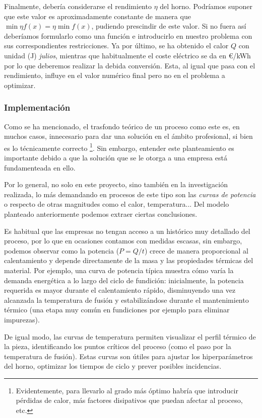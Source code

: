 Finalmente, debería considerarse el rendimiento $\eta$ del horno. Podríamos suponer que este valor es aproximadamente constante de manera que $\min{\eta f(x)} = \eta \min{f(x)}$, pudiendo prescindir de este valor. Si no fuera así deberíamos formularlo como una función e introducirlo en nuestro problema con sus correspondientes restricciones. Ya por último, se ha obtenido el calor $Q$ con unidad (J) \textit{julios}, mientras que habitualmente el coste eléctrico se da en \euro/kWh por lo que deberemos realizar la debida conversión. Esta, al igual que pasa con el rendimiento, influye en el valor numérico final pero no en el problema a optimizar.
%
%
\subsubsection{Implementación}
%
%
Como se ha mencionado, el trasfondo teórico de un proceso como este es, en muchos casos, innecesario para dar una solución en el ámbito profesional, si bien es lo técnicamente correcto \footnote{Evidentemente, para llevarlo al grado más óptimo habría que introducir pérdidas de calor, más factores disipativos que puedan afectar al proceso, etc.}. Sin embargo, entender este planteamiento es importante debido a que la solución que se le otorga a una empresa está fundamenteada en ello.

Por lo general, no solo en este proyecto, sino también en la investigación realizada, lo más demandando en procesos de este tipo son las \textit{curvas de potencia} o respecto de otras magnitudes como el calor, temperatura... Del modelo planteado anteriormente podemos extraer ciertas conclusiones.

Es habitual que las empresas no tengan acceso a un histórico muy detallado del proceso, por lo que en ocasiones contamos con medidas escasas, sin embargo, podemos observar como la potencia ($P = Q/t$) crece de manera proporcional al calentamiento y depende directamente de la masa y las propiedades térmicas del material. Por ejemplo, una curva de potencia típica muestra cómo varía la demanda energética a lo largo del ciclo de fundición: inicialmente, la potencia requerida es mayor durante el calentamiento rápido, disminuyendo una vez alcanzada la temperatura de fusión y estabilizándose durante el mantenimiento térmico (una etapa muy común en fundiciones por ejemplo para eliminar impurezas).

De igual modo, las curvas de temperatura permiten visualizar el perfil térmico de la pieza, identificando los puntos críticos del proceso (como el paso por la temperatura de fusión). Estas curvas son útiles para ajustar los hiperparámetros del horno, optimizar los tiempos de ciclo y prever posibles incidencias.
%
%
